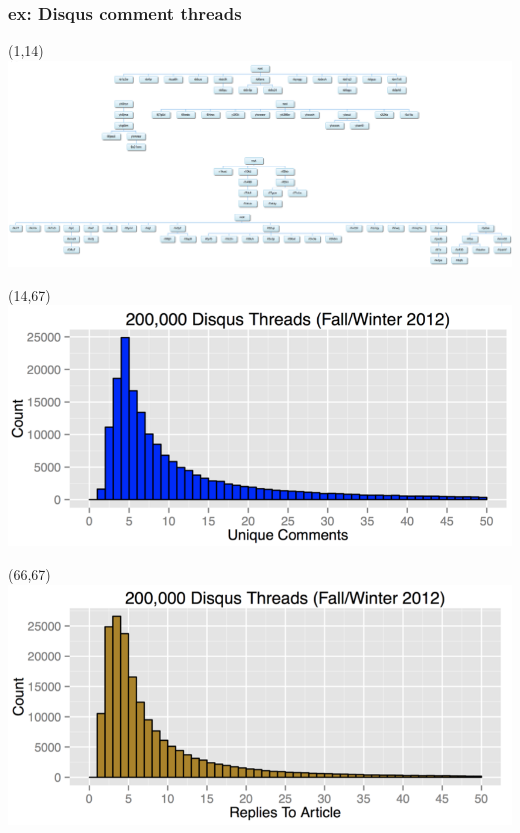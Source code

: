 \documentclass{beamer}
\begin{document}
\begin{frame} \frametitle{ex: Disqus comment threads}

\begin{textblock}{1}(1,14)
	\includegraphics[scale=0.155]{./imgs/disqus4.png}
\end{textblock}

\begin{textblock}{1}(14,67)
	\includegraphics[scale=0.165]{./imgs/disqus5.png}
\end{textblock}

\begin{textblock}{1}(66,67)
	\includegraphics[scale=0.17]{./imgs/disqus6.png}
\end{textblock}

\end{frame}
\end{document}
